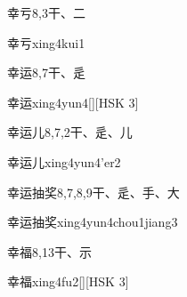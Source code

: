 \begin{entry}{幸亏}{8,3}{⼲、⼆}
  \begin{phonetics}{幸亏}{xing4kui1}
  \end{phonetics}
\end{entry}

\begin{entry}{幸运}{8,7}{⼲、⾡}
  \begin{phonetics}{幸运}{xing4yun4}[][HSK 3]
  \end{phonetics}
\end{entry}

\begin{entry}{幸运儿}{8,7,2}{⼲、⾡、⼉}
  \begin{phonetics}{幸运儿}{xing4yun4'er2}
  \end{phonetics}
\end{entry}

\begin{entry}{幸运抽奖}{8,7,8,9}{⼲、⾡、⼿、⼤}
  \begin{phonetics}{幸运抽奖}{xing4yun4chou1jiang3}
  \end{phonetics}
\end{entry}

\begin{entry}{幸福}{8,13}{⼲、⽰}
  \begin{phonetics}{幸福}{xing4fu2}[][HSK 3]
  \end{phonetics}
\end{entry}


